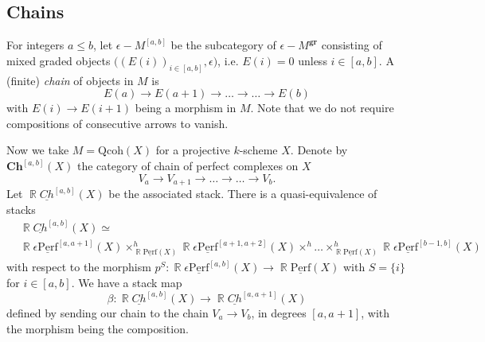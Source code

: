 \documentclass[reqno]{amsart}
\DeclareMathOperator\R{\mathbb R}
\theoremstyle{definition}
\theoremstyle{remark}
\newcommand{\ul}{\underline}
\newcommand{\eps}{\epsilon}
\newcommand{\uperf}{\ul{\mathrm{Perf}}}
\newcommand{\gr}{\mathbf{gr}}
\newcommand{\QC}{\mathrm{Qcoh}}
\newcommand{\chain}{\mathbf{Ch}}
\newcommand{\uchain}{\underline{Ch}}
\numberwithin{equation}{section}
\begin{document}
\subsection{Chains}\label{sec:chains}

For integers $a\leq b$, let $\eps-M^{[a,b]}$ be the subcategory of $\eps-M^\gr$ consisting of mixed graded objects $\Big((E(i))_{i\in [a,b]},\eps\Big)$, i.e. $E(i)=0$ unless $i\in [a,b]$.  A (finite) \emph{chain} of objects  in $M$ is
\[
E(a)\to E(a+1)\to \ldots \to\ldots\to E(b)
\]
with   $E(i)\to E(i+1)$ being a morphism in $M$. Note that we do not require compositions of consecutive arrows to vanish.

Now we take $M=\QC(X)$ for a projective $k$-scheme $X$. Denote by $\chain^{[a,b]}(X)$ the category of chain of perfect complexes on $X$
\[
V_a\to V_{a+1}\to \ldots \to\ldots\to V_b.
\] Let $\R\uchain^{[a,b]}(X)$ be the associated stack. There is a quasi-equivalence of stacks
\begin{align*}
&\R\uchain^{[a,b]}(X)\simeq \\
&\R\eps\uperf^{[a,a+1]}(X)\times^h_{\R\uperf(X)} \R\eps\uperf^{[a+1,a+2]}(X)\times^h\ldots \times^h_{\R\uperf(X)}  \R\eps\uperf^{[b-1,b]}(X)
\end{align*} with respect to the morphism $p^{S}: \R\eps\uperf^{[a,b]}(X)\to \R\uperf(X)$ with $S=\{i\}$ for $i\in [a,b]$. We have a stack map
\begin{equation}\label{Ch-beta-map-eq}
\beta: \R\uchain^{[a,b]}(X)\to \R\uchain^{[a,a+1]}(X)
\end{equation}
defined by sending our chain to the chain $V_a\to V_b$, in degrees $[a,a+1]$, with the morphism being the composition. 
\end{document}
